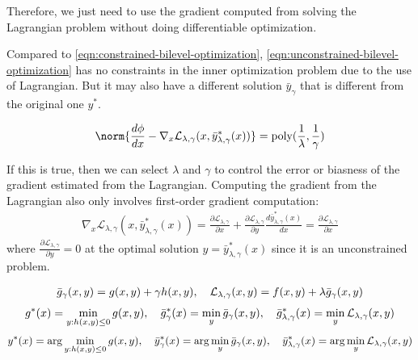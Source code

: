 Therefore, we just need to use the gradient computed from solving the Lagrangian problem without doing differentiable optimization.

Compared to \cref{eqn:constrained-bilevel-optimization}, \cref{eqn:unconstrained-bilevel-optimization} has no constraints in the inner optimization problem due to the use of Lagrangian. But it may also have a different solution $\bar{y}_\gamma$ that is different from the original one $y^*$.

\begin{theorem}
    \begin{align}
    \norm{\frac{d \phi}{d x} - \nabla_x \mathcal{L}_{\lambda,\gamma}(x, \bar{y}^*_{\lambda,\gamma}(x))} = \text{poly}(\frac{1}{\lambda}, \frac{1}{\gamma})
\end{align}
\end{theorem}
If this is true, then we can select $\lambda$ and $\gamma$ to control the error or biasness of the gradient estimated from the Lagrangian. Computing the gradient from the Lagrangian also only involves first-order gradient computation:
\begin{align}
    \nabla_x \mathcal{L}_{\lambda,\gamma}(x, \bar{y}^*_{\lambda,\gamma}(x)) = \frac{\partial \mathcal{L}_{\lambda,\gamma}}{\partial x} + \frac{\partial \mathcal{L}_{\lambda,\gamma}}{\partial y} \frac{d \bar{y}^*_{\lambda,\gamma}(x)}{d x} = \frac{\partial \mathcal{L}_{\lambda,\gamma}}{\partial x}
\end{align}
where $\frac{\partial \mathcal{L}_{\lambda,\gamma}}{\partial y} = 0$ at the optimal solution $y = \bar{y}^*_{\lambda,\gamma}(x)$ since it is an unconstrained problem.



\begin{definition}
\begin{align}
    \Bar{g}_\gamma(x,y) = g(x,y) + \gamma h(x,y), \quad \mathcal{L}_{\lambda,\gamma}(x,y) = f(x,y) + \lambda \Bar{g}_\gamma(x,y)
\end{align}
\begin{align}
    g^*(x) = \min_{y: h(x,y) \leq 0} g(x,y), \quad \Bar{g}^*_\gamma(x) = \min_{y} \Bar{g}_\gamma(x,y), \quad \Bar{g}^*_{\lambda,\gamma}(x) = \min_{y} \mathcal{L}_{\lambda,\gamma}(x,y)
\end{align}
\begin{align}
    y^*(x) = \arg\min_{y: h(x,y) \leq 0} g(x,y), \quad \Bar{y}^*_\gamma(x) = \arg\min_{y} \Bar{g}_\gamma(x,y), \quad \Bar{y}^*_{\lambda,\gamma}(x) = \arg\min_{y} \mathcal{L}_{\lambda,\gamma}(x,y)
\end{align}
\end{definition}


